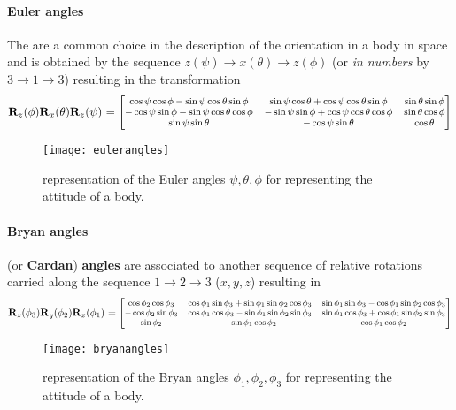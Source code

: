 		\paragraph{Euler angles} The  are a common choice in the description of the orientation in a body in space and is obtained by the sequence $z(\psi)\rightarrow x(\theta) \rightarrow z(\phi)$ (or \textit{in numbers} by $3\rightarrow 1 \rightarrow 3$) resulting in the transformation
		\begin{equation} \label{eq:kin:eulerangles}
				\mathbf{R}_z(\phi) \mathbf{R}_x(\theta) \mathbf{R}_z(\psi) \  { \footnotesize = \begin{bmatrix}  
				\cos \psi\cos\phi - \sin\psi\cos\theta\sin\phi & \sin\psi \cos\theta + \cos\psi \cos\theta\sin\phi & \sin\theta \sin \phi \\
				-\cos\psi\sin\phi - \sin\psi\cos\theta\cos\phi & - \sin\psi\sin\phi + \cos\psi\cos\theta\cos\phi & \sin\theta\cos\phi \\
				\sin\psi \sin\theta& -\cos\psi \sin\theta & \cos\theta \end{bmatrix} }	
		\end{equation}
		
		\begin{SCfigure}[2][bht]
			\centering \texttt{[image: eulerangles]}
			\caption{representation of the Euler angles $\psi,\theta,\phi$ for representing the attitude of a body.}
		\end{SCfigure}
		
		\paragraph{Bryan angles}  (or \textbf{Cardan}) \textbf{angles} are associated to another sequence of relative rotations carried along the sequence $1\rightarrow 2 \rightarrow 3$ ($x,y,z$) resulting in
		\begin{equation} 
			 \mathbf{R}_z(\phi_3) \mathbf{R}_y(\phi_2) \mathbf{R}_x(\phi_1) \ { \footnotesize = \begin{bmatrix}  \cos\phi_2\cos\phi_3 & \cos\phi_1\sin\phi_3 + \sin\phi_1\sin\phi_2\cos\phi_3 & \sin\phi_1\sin\phi_3 - \cos\phi_1\sin\phi_2\cos\phi_3 \\
					-\cos\phi_2\sin\phi_3 & \cos\phi_1 \cos\phi_3 - \sin\phi_1 \sin\phi_2 \sin\phi_3 & \sin\phi_1\cos\phi_3 + \cos\phi_1\sin\phi_2\sin\phi_3 \\
					\sin\phi_2 & -\sin\phi_1\cos\phi_2 & \cos\phi_1\cos\phi_2  \end{bmatrix} }
		\end{equation}
	
		\begin{SCfigure}[2][bht]
			\centering \texttt{[image: bryanangles]}
			\caption{representation of the Bryan angles $\phi_1,\phi_2,\phi_3$ for representing the attitude of a body.}
		\end{SCfigure}
	
